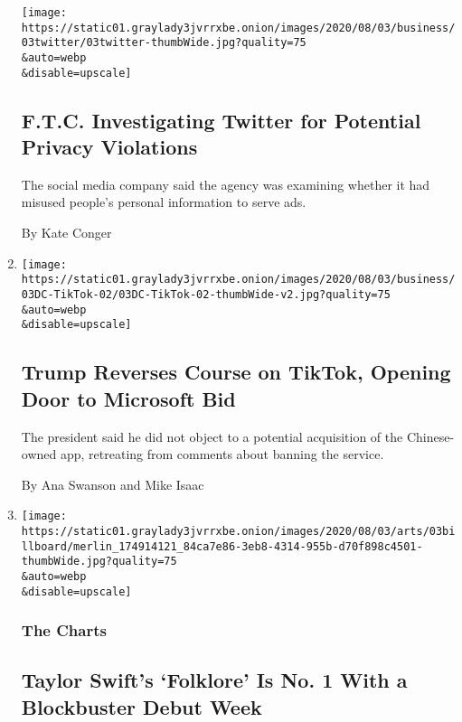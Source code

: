 \begin{enumerate}
  \texttt{[image: https://static01.graylady3jvrrxbe.onion/images/2020/08/03/business/03twitter/03twitter-thumbWide.jpg?quality=75\\\&auto=webp\\\&disable=upscale]}

  \hypertarget{ftc-investigating-twitter-for-potential-privacy-violations}{%
  \subsection{F.T.C. Investigating Twitter for Potential Privacy
  Violations}\label{ftc-investigating-twitter-for-potential-privacy-violations}}

  The social media company said the agency was examining whether it had
  misused people's personal information to serve ads.

  By Kate Conger
\item
  \href{/2020/08/03/technology/trump-tiktok-microsoft.html}{}

  \texttt{[image: https://static01.graylady3jvrrxbe.onion/images/2020/08/03/business/03DC-TikTok-02/03DC-TikTok-02-thumbWide-v2.jpg?quality=75\\\&auto=webp\\\&disable=upscale]}

  \hypertarget{trump-reverses-course-on-tiktok-opening-door-to-microsoft-bid}{%
  \subsection{Trump Reverses Course on TikTok, Opening Door to Microsoft
  Bid}\label{trump-reverses-course-on-tiktok-opening-door-to-microsoft-bid}}

  The president said he did not object to a potential acquisition of the
  Chinese-owned app, retreating from comments about banning the service.

  By Ana Swanson and Mike Isaac
\item
  \href{/2020/08/03/arts/music/taylor-swift-folklore-billboard-chart.html}{}

  \texttt{[image: https://static01.graylady3jvrrxbe.onion/images/2020/08/03/arts/03billboard/merlin\_174914121\_84ca7e86-3eb8-4314-955b-d70f898c4501-thumbWide.jpg?quality=75\\\&auto=webp\\\&disable=upscale]}

  \hypertarget{the-charts}{%
  \subsubsection{The Charts}\label{the-charts}}

  \hypertarget{taylor-swifts-folklore-is-no-1-with-a-blockbuster-debut-week}{%
  \subsection{Taylor Swift's `Folklore' Is No. 1 With a Blockbuster
  Debut
  Week}\label{taylor-swifts-folklore-is-no-1-with-a-blockbuster-debut-week}}


\end{enumerate}
